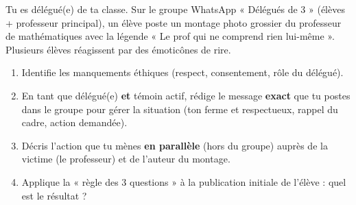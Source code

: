 \documentclass[11pt]{article}
\begin{document}
\begin{exercice}
Tu es délégué(e) de ta classe. Sur le groupe WhatsApp « Délégués de 3 » (élèves + professeur principal), un élève poste un montage photo grossier du professeur de mathématiques avec la légende « Le prof qui ne comprend rien lui-même ». Plusieurs élèves réagissent par des émoticônes de rire.
\begin{enumerate}
    \item Identifie les manquements éthiques (respect, consentement, rôle du délégué).
    \item En tant que délégué(e) \textbf{et} témoin actif, rédige le message \textbf{exact} que tu postes dans le groupe pour gérer la situation (ton ferme et respectueux, rappel du cadre, action demandée).
    \item Décris l'action que tu mènes \textbf{en parallèle} (hors du groupe) auprès de la victime (le professeur) et de l'auteur du montage.
    \item Applique la « règle des 3 questions » à la publication initiale de l'élève : quel est le résultat ?
\end{enumerate}
\end{exercice}
\end{document}
